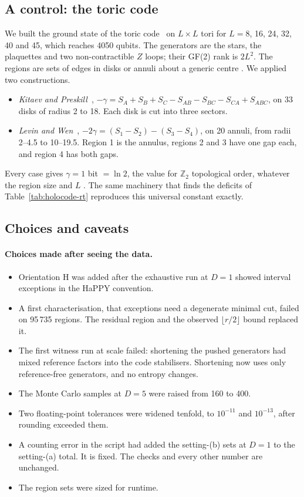 \subsection{A control: the toric code}\label{sec:holocode-toric}

We built the ground state of the toric code~\cite{kitaev2003} on $L\times L$ tori for $L=8$, 16, 24, 32, 40 and 45, which reaches 4050
qubits. The generators are the stars, the plaquettes and two non-contractible $Z$ loops; their GF(2) rank is $2L^2$. The regions are
sets of edges in disks or annuli about a generic centre . We applied two constructions.
\begin{itemize}[nosep]
\item \emph{Kitaev and Preskill}~\cite{kitaev2006}, $-\gamma=S_A+S_B+S_C-S_{AB}-S_{BC}-S_{CA}+S_{ABC}$, on 33 disks of radius 2 to 18.
  Each disk is cut into three sectors.
\item \emph{Levin and Wen}~\cite{levin2006}, $-2\gamma=(S_1-S_2)-(S_3-S_4)$, on 20 annuli, from radii 2--4.5 to 10--19.5. Region 1 is
  the annulus, regions 2 and 3 have one gap each, and region 4 has both gaps.
\end{itemize}
Every case gives $\gamma=1$ bit $=\ln2$, the value for $\mathbb Z_2$ topological order, whatever the region size and $L$ \tagP. The same
machinery that finds the deficits of Table~\ref{tab:holocode-rt} reproduces this universal constant exactly.

\subsection{Choices and caveats}\label{sec:holocode-caveats}

\paragraph{Choices made after seeing the data.}
\begin{itemize}[nosep]
\item Orientation H was added after the exhaustive run at $D=1$ showed interval exceptions in the HaPPY convention.
\item A first characterisation, that exceptions need a degenerate minimal cut, failed on 95\,735 regions. The residual region and the
  observed $\lfloor r/2\rfloor$ bound replaced it.
\item The first witness run at scale failed: shortening the pushed generators had mixed reference factors into the code stabilisers.
  Shortening now uses only reference-free generators, and no entropy changes.
\item The Monte Carlo samples at $D=5$ were raised from 160 to 400.
\item Two floating-point tolerances were widened tenfold, to $10^{-11}$ and $10^{-13}$, after rounding exceeded them.
\item A counting error in the script had added the setting-(b) sets at $D=1$ to the setting-(a) total. It is fixed. The checks and every
  other number are unchanged.
\item The region sets were sized for runtime.
\end{itemize}

